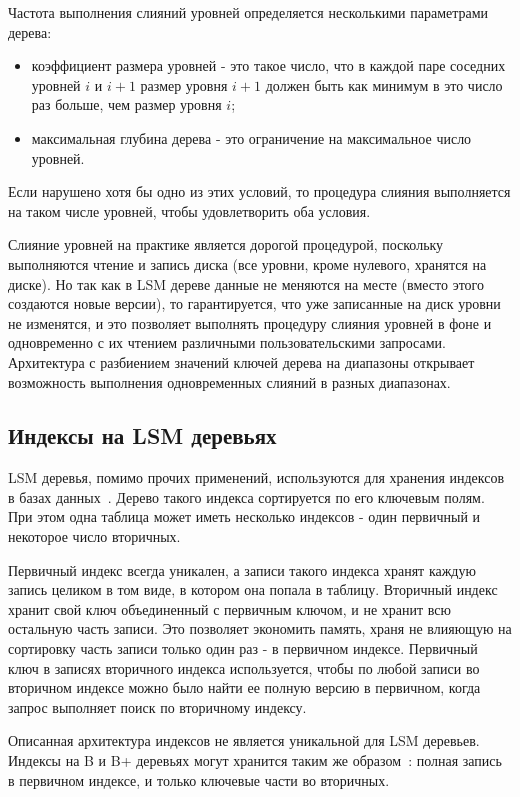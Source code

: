 \documentclass[a4paper,hidelinks,12pt]{article}
\begin{document}
Частота выполнения слияний уровней определяется несколькими параметрами дерева:
\begin{itemize}
\item коэффициент размера уровней - это такое число, что в каждой паре соседних
уровней $i$ и $i + 1$ размер уровня $i + 1$ должен быть как минимум в это число
раз больше, чем размер уровня $i$;
\item максимальная глубина дерева - это ограничение на максимальное число
уровней.
\end{itemize}

Если нарушено хотя бы одно из этих условий, то процедура слияния выполняется на
таком числе уровней, чтобы удовлетворить оба условия.

Слияние уровней на практике является дорогой процедурой, поскольку выполняются
чтение и запись диска (все уровни, кроме нулевого, хранятся на диске). Но так
как в LSM дереве данные не меняются на месте (вместо этого создаются новые
версии), то гарантируется, что уже записанные на диск уровни не изменятся, и это
позволяет выполнять процедуру слияния уровней в фоне и одновременно с их чтением
различными пользовательскими запросами. Архитектура с разбиением значений ключей
дерева на диапазоны открывает возможность выполнения одновременных слияний в
разных диапазонах.

\subsection{Индексы на LSM деревьях}

LSM деревья, помимо прочих применений, используются для хранения индексов в
базах данных~\cite{leveldb, rocksdb, tarantool}. Дерево такого индекса
сортируется по его ключевым полям. При этом одна таблица может иметь несколько
индексов - один первичный и некоторое число вторичных.

Первичный индекс всегда уникален, а записи такого индекса хранят каждую запись
целиком в том виде, в котором она попала в таблицу. Вторичный индекс хранит свой
ключ объединенный с первичным ключом, и не хранит всю остальную часть записи.
Это позволяет экономить память, храня не влияющую на сортировку часть записи
только один раз - в первичном индексе. Первичный ключ в записях вторичного
индекса используется, чтобы по любой записи во вторичном индексе можно было
найти ее полную версию в первичном, когда запрос выполняет поиск по вторичному
индексу.

Описанная архитектура индексов не является уникальной для LSM деревьев. Индексы
на B и B+ деревьях могут хранится таким же
образом~\cite{secondary-search, sqlite}: полная запись в первичном индексе, и
только ключевые части во вторичных.
\end{document}
